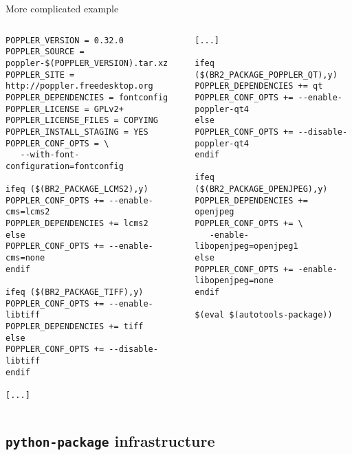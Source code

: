\begin{frame}[fragile]{More complicated  example}
  \begin{columns}
    \begin{block}{}
      \begin{verbatim}
POPPLER_VERSION = 0.32.0
POPPLER_SOURCE = poppler-$(POPPLER_VERSION).tar.xz
POPPLER_SITE = http://poppler.freedesktop.org
POPPLER_DEPENDENCIES = fontconfig
POPPLER_LICENSE = GPLv2+
POPPLER_LICENSE_FILES = COPYING
POPPLER_INSTALL_STAGING = YES
POPPLER_CONF_OPTS = \
   --with-font-configuration=fontconfig

ifeq ($(BR2_PACKAGE_LCMS2),y)
POPPLER_CONF_OPTS += --enable-cms=lcms2
POPPLER_DEPENDENCIES += lcms2
else
POPPLER_CONF_OPTS += --enable-cms=none
endif

ifeq ($(BR2_PACKAGE_TIFF),y)
POPPLER_CONF_OPTS += --enable-libtiff
POPPLER_DEPENDENCIES += tiff
else
POPPLER_CONF_OPTS += --disable-libtiff
endif

[...]
\end{verbatim}
\end{block}
    \begin{block}{}
      \begin{verbatim}
[...]

ifeq ($(BR2_PACKAGE_POPPLER_QT),y)
POPPLER_DEPENDENCIES += qt
POPPLER_CONF_OPTS += --enable-poppler-qt4
else
POPPLER_CONF_OPTS += --disable-poppler-qt4
endif

ifeq ($(BR2_PACKAGE_OPENJPEG),y)
POPPLER_DEPENDENCIES += openjpeg
POPPLER_CONF_OPTS += \
   -enable-libopenjpeg=openjpeg1
else
POPPLER_CONF_OPTS += -enable-libopenjpeg=none
endif

$(eval $(autotools-package))
      \end{verbatim}
    \end{block}
  \end{columns}
\end{frame}

\subsection{{\tt python-package} infrastructure}

